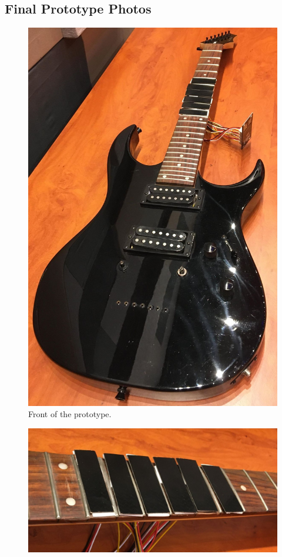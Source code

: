 \clearpage

\begin{appendices}

\section{Final Prototype Photos}
\label{appendices:guitarimages}
\centering
\begin{figure}[h]
    \centering
    \includegraphics[scale=0.25]{Images/guitargui.jpg}
    \caption{Front of the prototype.}
    \label{fig:my_label}
\end{figure}
\begin{figure}[h]
    \centering
    \includegraphics[scale=0.2]{Images/neck.jpg}

\end{figure}
\end{appendices}
